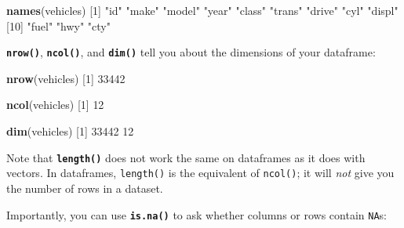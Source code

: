 \documentclass[
]{book}
\newenvironment{Shaded}{\begin{snugshade}}{\end{snugshade}}
\newcommand{\DecValTok}[1]{\textcolor[rgb]{0.00,0.00,0.81}{#1}}
\newcommand{\KeywordTok}[1]{\textcolor[rgb]{0.13,0.29,0.53}{\textbf{#1}}}
\newcommand{\NormalTok}[1]{#1}
\newcommand{\StringTok}[1]{\textcolor[rgb]{0.31,0.60,0.02}{#1}}
\begin{document}
\begin{Shaded}
\begin{Highlighting}[]
\KeywordTok{names}\NormalTok{(vehicles) }
\NormalTok{ [}\DecValTok{1}\NormalTok{] }\StringTok{"id"}    \StringTok{"make"}  \StringTok{"model"} \StringTok{"year"}  \StringTok{"class"} \StringTok{"trans"} \StringTok{"drive"} \StringTok{"cyl"}   \StringTok{"displ"}
\NormalTok{[}\DecValTok{10}\NormalTok{] }\StringTok{"fuel"}  \StringTok{"hwy"}   \StringTok{"cty"}  
\end{Highlighting}
\end{Shaded}

\textbf{\texttt{nrow()}}, \textbf{\texttt{ncol()}}, and \textbf{\texttt{dim()}} tell you about the dimensions of your dataframe:

\begin{Shaded}
\begin{Highlighting}[]
\KeywordTok{nrow}\NormalTok{(vehicles) }
\NormalTok{[}\DecValTok{1}\NormalTok{] }\DecValTok{33442}
\end{Highlighting}
\end{Shaded}

\begin{Shaded}
\begin{Highlighting}[]
\KeywordTok{ncol}\NormalTok{(vehicles) }
\NormalTok{[}\DecValTok{1}\NormalTok{] }\DecValTok{12}
\end{Highlighting}
\end{Shaded}

\begin{Shaded}
\begin{Highlighting}[]
\KeywordTok{dim}\NormalTok{(vehicles) }
\NormalTok{[}\DecValTok{1}\NormalTok{] }\DecValTok{33442}    \DecValTok{12}
\end{Highlighting}
\end{Shaded}

Note that \textbf{\texttt{length()}} does not work the same on dataframes as it does with vectors. In dataframes, \texttt{length()} is the equivalent of \texttt{ncol()}; it will \emph{not} give you the number of rows in a dataset.

Importantly, you can use \textbf{\texttt{is.na()}} to ask whether columns or rows contain \texttt{NA}s:
\end{document}
